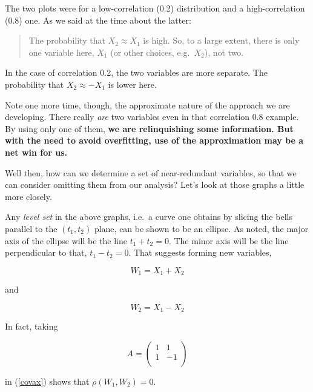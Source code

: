 The two plots were for a low-correlation (0.2) distribution and a
high-correlation (0.8) one.  As we said at the time about the latter:

\begin{quote}

The probability that $X_2 \approx X_1$ is high.  So, to a large extent,
there is only one variable here, $X_1$ (or other choices, e.g.\ $X_2$),
not two.  

\end{quote}

In the case of correlation 0.2, the two variables are more separate.
The probability that $X_2 \approx -X_1$ is lower here.

Note one more time, though, the approximate nature of the approach we
are developing.  There really \textit{are} two variables even in that
correlation 0.8 example.  By using only one of them, \textbf{we are
relinquishing some information.  But with the need to avoid overfitting,
use of the approximation may be a net win for us.}

Well then, how can we determine a set of near-redundant variables, so
that we can consider omitting them from our analysis?  Let's look at
those graphs a little more closely.

Any \textit{level set} in the above graphs, i.e.\ a curve one
obtains by slicing the bells parallel to the $(t_1,t_2)$ plane, can be
shown to be an ellipse.  As noted, the major axis of the ellipse will be
the line $t_1 + t_2 = 0$.  The minor axis will be the line perpendicular
to that, $t_1 - t_2 = 0$.  That suggests forming new variables,

\begin{equation}
W_1 = X_1 + X_2 
\end{equation}

and 

\begin{equation}
W_2 = X_1 - X_2 
\end{equation}

In fact, taking

\begin{equation}
A = 
\left (
\begin{array}{rr}
1 & 1 \\
1 & -1 \\
\end{array}
\right )
\end{equation}

in (\ref{covax}) shows that $\rho(W_1,W_2) = 0$.

